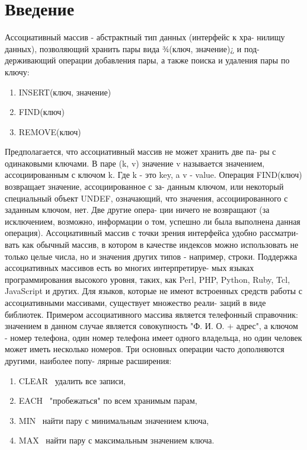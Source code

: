 \chapter*{Введение}\label{Input}

Ассоциативный массив - абстрактный тип данных (интерфейс к хра-
нилищу данных), позволяющий хранить пары вида ¾(ключ, значение)¿ и под-
держивающий операции добавления пары, а также поиска и удаления пары
по ключу:

\begin{enumerate}
  \item INSERT(ключ, значение)
  \item FIND(ключ)
  \item REMOVE(ключ)
\end{enumerate}

Предполагается, что ассоциативный массив не может хранить две па-
ры с одинаковыми ключами.
В паре (k, v) значение v называется значением, ассоциированным с
ключом k. Где k - это key, a v - value.
Операция FIND(ключ) возвращает значение, ассоциированное с за-
данным ключом, или некоторый специальный объект UNDEF, означающий,
что значения, ассоциированного с заданным ключом, нет. Две другие опера-
ции ничего не возвращают (за исключением, возможно, информации о том,
успешно ли была выполнена данная операция).
Ассоциативный массив с точки зрения интерфейса удобно рассматри-
вать как обычный массив, в котором в качестве индексов можно использовать
не только целые числа, но и значения других типов - например, строки.
Поддержка ассоциативных массивов есть во многих интерпретируе-
мых языках программирования высокого уровня, таких, как Perl, PHP, Python,
Ruby, Tcl, JavaScript и других. Для языков, которые не имеют встроенных
средств работы с ассоциативными массивами, существует множество реали-
заций в виде библиотек.
Примером ассоциативного массива является телефонный справочник:
значением в данном случае является совокупность "Ф. И. О. + адрес", а
ключом - номер телефона, один номер телефона имеет одного владельца, но
один человек может иметь несколько номеров.
Три основных операции часто дополняются другими, наиболее попу-
лярные расширения:

\begin{enumerate}
  \item CLEAR \ удалить все записи,
  \item EACH \ "пробежаться" по всем хранимым парам,
  \item MIN \ найти пару с минимальным значением ключа,
  \item MAX \ найти пару с максимальным значением ключа.
\end{enumerate}


